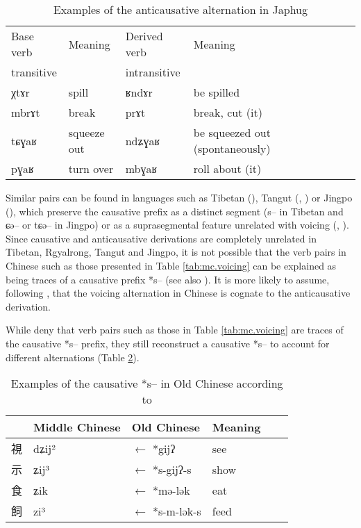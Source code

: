 \documentclass[oldfontcommands,oneside,a4paper,11pt]{article}
\newcommand{\ipa}[1]{{\phon \mbox{#1}}} %
\newcommand{\zh}[1]{{\cn #1}}
\begin{document}
 \begin{table}[h]
\caption{Examples of the anticausative alternation in Japhug}\label{tab:anticausative} \centering
\begin{tabular}{lllllllll} \toprule
Base   verb &Meaning &Derived verb &Meaning \\
transitive & &intransitive\\
\midrule
   \ipa{χtɤr} & spill & \ipa{ʁndɤr} & be spilled \\
      \ipa{mbrɤt} & break & \ipa{prɤt} & break, cut (it) \\
   \ipa{tɕɣaʁ} & squeeze out & \ipa{ndʑɣaʁ} & be squeezed out (spontaneously) \\
   \ipa{pɣaʁ} & turn over &    \ipa{mbɣaʁ} & roll about (it) \\
\bottomrule
\end{tabular}
\end{table}


Similar pairs can be found in languages such as Tibetan (\citealt{hill14voicing}), Tangut (\citealt{gong88alternations}, \citealt[245-8]{jacques14esquisse}) or Jingpo (\citealt[78]{dai90yufa}), which preserve the causative prefix as a distinct segment (\ipa{s--} in Tibetan and \ipa{ɕə--} or \ipa{tɕə--} in Jingpo) or as a suprasegmental feature unrelated with voicing (\citealt{gong99jinyuanyin}, \citealt[250-1]{jacques14esquisse}). Since causative and anticausative derivations are completely unrelated in Tibetan, Rgyalrong, Tangut and Jingpo, it is not possible that the verb pairs in Chinese such as those presented in Table \ref{tab:mc.voicing} can be explained as being traces of a causative prefix *\ipa{s--} (see also \citealt{lapolla03}). It is more likely to assume, following  \citet{sagart12sprefix}, that the voicing alternation in Chinese is cognate to the anticausative derivation.

While \citet{sagart12sprefix} deny that   verb pairs such as those in Table \ref{tab:mc.voicing} are traces of the causative *\ipa{s--} prefix, they still reconstruct a causative *\ipa{s--} to account for different alternations (Table \ref{tab:caus.oc}).
   \begin{table}[h]
\caption{Examples of the causative *\ipa{s--} in Old Chinese according to \citet{sagart12sprefix}}\label{tab:caus.oc} \centering
\begin{tabular}{llllll}
\toprule
  &Middle Chinese  &Old Chinese &Meaning \\
  \midrule
  \zh{視}& \ipa{dʑij²} &$\leftarrow$ *\ipa{gijʔ}  & see \\
\zh{示}& \ipa{ʑij³} &$\leftarrow$ *\ipa{s-gijʔ-s}  & show \\
\zh{食}& \ipa{ʑik} &$\leftarrow$ *\ipa{mə-lək}  & eat \\
\zh{飼}& \ipa{zi³} &$\leftarrow$ *\ipa{s-m-lək-s}  & feed \\
\bottomrule
\end{tabular}
\end{table}
\end{document}
